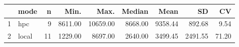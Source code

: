 \begin{table}[ht]
\centering
\begin{tabular}{rlrrrrrrr}
  \hline
 & mode & n & Min. & Max. & Median & Mean & SD & CV \\ 
  \hline
1 & hpc &   9 & 8611.00 & 10659.00 & 8668.00 & 9358.44 & 892.68 & 9.54 \\ 
  2 & local &  11 & 1229.00 & 8697.00 & 2640.00 & 3499.45 & 2491.55 & 71.20 \\ 
   \hline
\end{tabular}
\end{table}

